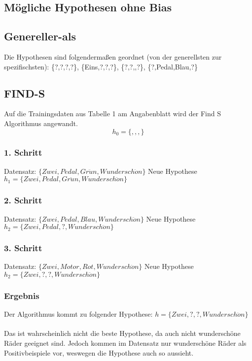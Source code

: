\documentclass[a4paper]{article}
\begin{document}
\subsection{Mögliche Hypothesen ohne Bias}

\subsection{Genereller-als}
Die Hypothesen sind folgendermaßen geordnet (von der generellsten zur spezifischsten): \{?,?,?,?\}, \{Eins,?,?,?\}, \{?,?,,?\}, \{?,Pedal,Blau,?\}

\subsection{FIND-S}
Auf die Trainingsdaten aus Tabelle 1 am Angabenblatt wird der Find S Algorithmus angewandt.
\[
	h_0 = \{,,,\}
\]
\subsubsection{1. Schritt}
Datensatz: $ \{Zwei, Pedal, Gr\ddot{u}n, Wundersch\ddot{o}n\} $\newline
Neue Hypothese $ h_1 = \{Zwei, Pedal, Gr\ddot{u}n, Wundersch\ddot{o}n\}$

\subsubsection{2. Schritt}
Datensatz: $ \{Zwei, Pedal, Blau, Wundersch\ddot{o}n\} $\newline
Neue Hypothese $ h_2 = \{Zwei, Pedal, ?, Wundersch\ddot{o}n\}$

\subsubsection{3. Schritt}
Datensatz: $ \{Zwei, Motor, Rot, Wundersch\ddot{o}n\} $\newline
Neue Hypothese $ h_2 = \{Zwei, ?, ?, Wundersch\ddot{o}n\}$

\subsubsection{Ergebnis}
Der Algorithmus kommt zu folgender Hypothese: $ h = \{Zwei, ?, ?, Wundersch\ddot{o}n\}$
\paragraph{}
Das ist wahrscheinlich nicht die beste Hypothese, da auch nicht wunderschöne Räder geeignet sind. Jedoch kommen im Datensatz nur wunderschöne Räder als Positivbeispiele vor, weswegen die Hypothese auch so aussieht.
\end{document}
